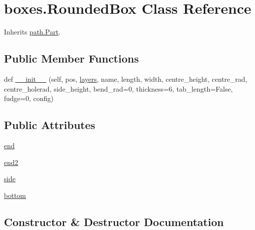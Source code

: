 \hypertarget{classboxes_1_1_rounded_box}{}\section{boxes.\+Rounded\+Box Class Reference}
\label{classboxes_1_1_rounded_box}


Inherits \hyperlink{classpath_1_1_part}{path.\+Part}.

\subsection*{Public Member Functions}
\begin{DoxyCompactItemize}
\item 
def \hyperlink{classboxes_1_1_rounded_box_a820ee46cf38c83dc8c74a0e1679bb48f}{\+\_\+\+\_\+init\+\_\+\+\_\+} (self, pos, \hyperlink{classpath_1_1_part_adcfeed4d6166f35e3ea1eb87926f6a5e}{layers}, name, length, width, centre\+\_\+height, centre\+\_\+rad, centre\+\_\+holerad, side\+\_\+height, bend\+\_\+rad=0, thickness=6, tab\+\_\+length=False, fudge=0, config)
\end{DoxyCompactItemize}
\subsection*{Public Attributes}
\begin{DoxyCompactItemize}
\item 
\hyperlink{classboxes_1_1_rounded_box_abbd3848c34516c2a8c1ad080c5643a1e}{end}
\item 
\hyperlink{classboxes_1_1_rounded_box_a0bfab353f08c5f127b2811db4a8eb8ac}{end2}
\item 
\hyperlink{classboxes_1_1_rounded_box_a1e345027fcdf3930a1e4c6f9c5bfaccf}{side}
\item 
\hyperlink{classboxes_1_1_rounded_box_a314bf4364532c8f957a5c7c7979fef58}{bottom}
\end{DoxyCompactItemize}


\subsection{Constructor \& Destructor Documentation}
\hypertarget{classboxes_1_1_rounded_box_a820ee46cf38c83dc8c74a0e1679bb48f}{}
